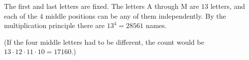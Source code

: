 The first and last letters are fixed. The letters A through M are $13$ letters, and each of the $4$ middle positions can be any of them independently. By the multiplication principle there are $13^4=\boxed{28561}$ names.

(If the four middle letters had to be different, the count would be $13\cdot12\cdot11\cdot10=17160$.)
